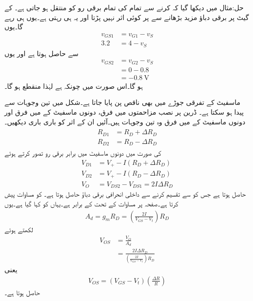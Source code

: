حل:مثال  میں دیکھا گیا کہ  کرنے سے تمام کی تمام برقی رو  کو منتقل ہو جاتی ہے۔ کے گیٹ پر برقی دباؤ مزید بڑھانے سے  پر کوئی اثر نہیں پڑتا اور یہ  ہی رہتی ہے۔یوں  ہی رہے گا۔یوں
\begin{align*}
v_{GS1}&=v_{G1}-v_S\\
3.2&=4-v_S
\end{align*}
سے  حاصل ہوتا ہے اور یوں
\begin{align*}
v_{GS2}&=v_{G2}-v_S\\
&=0-0.8\\
&=\SI{-0.8}{\volt}
\end{align*}
ہو گا۔اس صورت میں چونکہ  ہے لہٰذا  منقطع ہو گا۔

ماسفیٹ کے تفرقی جوڑے میں بھی ناقص پن پایا جاتا ہے۔شکل  میں  تین وجوہات سے پیدا ہو سکتا ہے۔ ڈرین پر نصب مزاحمتوں میں فرق، دونوں ماسفیٹ کے  میں فرق اور دونوں ماسفیٹ کے  میں فرق وہ تین وجوہات ہیں۔آئیں ان کے اثر کو باری باری دیکھیں۔
\begin{gather}
\begin{aligned}
R_{D1}&=R_D+\Delta R_D\\
R_{D2}&=R_D-\Delta R_D
\end{aligned}
\end{gather}
کی صورت میں دونوں ماسفیٹ میں برابر برقی رو  تصور کرتے ہوئے
\begin{align*}
V_{D1}&=V_{+}-I \left(R_D+\Delta R_D \right)\\
V_{D2}&=V_{+}-I \left(R_D-\Delta R_D \right)\\
V_O&=V_{DS2}-V_{DS1}=2 I\Delta R_D 
\end{align*}
حاصل ہوتا ہے جس کو  سے تقسیم کرنے سے داخلی انحرافی برقی دباؤ حاصل ہوتا ہے۔ کو مساوات  پیش کرتا ہے۔صفحہ  پر مساوات  کے تحت  کے برابر ہے۔یہاں   کو  کہا گیا ہے۔یوں
\begin{align*}
A_d=g_m R_D=\left(\frac{2 I}{V_{GS}-V_t}\right) R_D
\end{align*} 
لکھتے ہوئے
\begin{align*}
V_{OS}&=\frac{V_O}{A_d}\\
&=\frac{2 I\Delta R_D }{\left(\frac{2 I}{V_{GS}-V_t}\right) R_D}
\end{align*}
یعنی
\begin{align}
V_{OS}=\left(V_{GS}-V_t \right)\left(\frac{\Delta R}{R}\right)
\end{align}
حاصل ہوتا ہے۔

